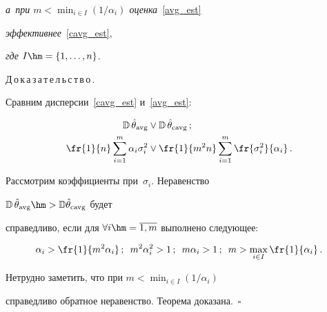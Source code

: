 \textit{а~при $m < 


\min\nolimits_{i \in {I}} ({1}/{\alpha_i})$ оценка}~\eqref{avg_est} 


\textit{эффективнее}~\eqref{cavg_est}, 


\textit{где ${I}\hm = \{1,\dots, n\}$}. 





\smallskip





\noindent


Д\,о\,к\,а\,з\,а\,т\,е\,л\,ь\,с\,т\,в\,о\,.\ \ 


Сравним дисперсии~\eqref{cavg_est} и~\eqref{avg_est}:


\begin{align*}


\mathbb{D}\,\hat{\theta}_{\mathrm{avg}} &\vee \mathbb{D}\,\hat{\theta}_{\mathrm{cavg}}\,; \\


\fr{1}{n}\sum\limits_{i=1}^m\alpha_i\sigma_i^2 &\vee \fr{1}{m^2 


n}\sum\limits_{i=1}^m \fr{\sigma_i^2}{\alpha_i}\,.


\end{align*}


Рассмотрим коэффициенты при~$\sigma_i$. Неравенство 


$\mathbb{D}\,\hat{\theta}_{\mathrm{avg}} \hm> \mathbb{D}\hat{\theta}_{\mathrm{cavg}}$ будет 


справедливо, если для $\forall i\hm = \overline{1,m}$ выполнено следующее:


\begin{equation*}


\alpha_i > \fr{1}{m^2\alpha_i}\,; \enskip


m^2 \alpha_i^2 > 1\,;\enskip


m \alpha_i > 1\,;\enskip


m  > \max\limits_{i \in I} \fr{1}{\alpha_i}\,.


\end{equation*}


Нетрудно заметить, что при $m < \min\nolimits_{i \in I} ({1}/{\alpha_i})$ 


справедливо обратное неравенство. Теорема доказана.~\hfill$\square$





\vspace*{2pt}









